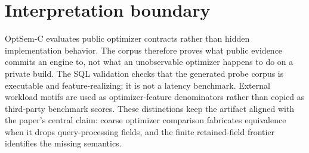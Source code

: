 \documentclass[10pt]{article}
\begin{document}
\section*{Interpretation boundary}
OptSem-C evaluates public optimizer contracts rather than hidden implementation behavior.  The corpus therefore proves what public evidence commits an engine to, not what an unobservable optimizer happens to do on a private build.  The SQL validation checks that the generated probe corpus is executable and feature-realizing; it is not a latency benchmark.  External workload motifs are used as optimizer-feature denominators rather than copied as third-party benchmark scores.  These distinctions keep the artifact aligned with the paper's central claim: coarse optimizer comparison fabricates equivalence when it drops query-processing fields, and the finite retained-field frontier identifies the missing semantics.
\end{document}
